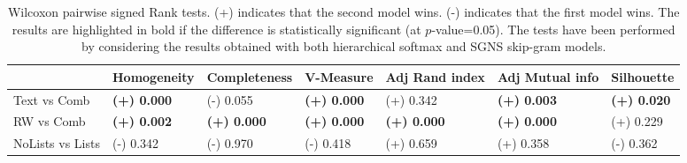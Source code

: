 \begin{landscape}
\begin{table}[h]
\centering
\caption{Wilcoxon pairwise signed Rank tests. (+) indicates that the second model wins. (-) indicates that the first model wins. The results are highlighted in bold if the difference is statistically significant (at $p$-value=0.05). The tests have been performed by considering the results obtained with both hierarchical softmax and SGNS skip-gram models.}
\label{tab:Wilcoxon}
\begin{tabular}{|l|l|l|l|l|l|l|}
\hline
&Homogeneity & Completeness & V-Measure & Adj Rand index & Adj Mutual info & Silhouette \\ \hline \hline
Text vs Comb & \textbf{(+) 0.000} & (-) 0.055 & \textbf{(+) 0.000} & (+) 0.342 & \textbf{(+) 0.003} & \textbf{(+) 0.020}\\ \hline
RW vs Comb & \textbf{(+) 0.002} & \textbf{(+) 0.000} & \textbf{(+) 0.000} & \textbf{(+) 0.000} & \textbf{(+) 0.000} & (+) 0.229\\ \hline
NoLists vs Lists & (-) 0.342 & (-) 0.970 & (-) 0.418 & (+) 0.659 & (+) 0.358 & (-) 0.362\\ \hline
\end{tabular}
\end{table}


\end{landscape}
